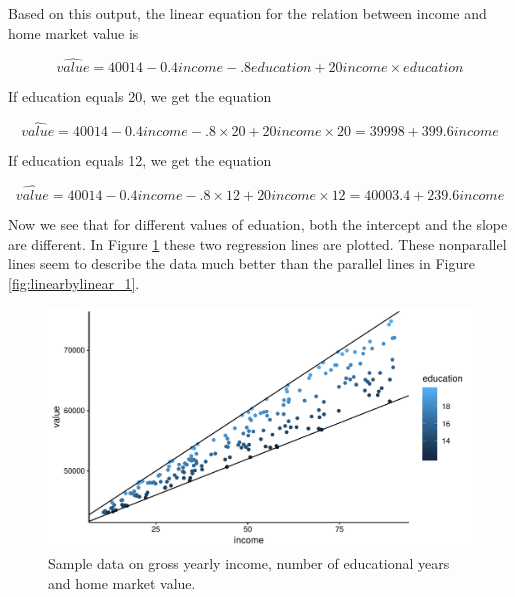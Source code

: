 \documentclass[]{book}\usepackage[]{graphicx}\usepackage[]{color}
\makeatletter
\def\maxwidth{ %
  \ifdim\Gin@nat@width>\linewidth
    \linewidth
  \else
    \Gin@nat@width
  \fi
}
\makeatother
\begin{document}
Based on this output, the linear equation for the relation between income and home market value is 

\begin{equation}
\widehat{value}= 40014 -0.4 income -.8 education + 20 income \times education
\end{equation}

If education equals 20, we get the equation

\begin{equation}
\widehat{value}= 40014 -0.4 income -.8 \times 20 + 20 income \times 20 = 39998 + 399.6 income
\end{equation}

If education equals 12, we get the equation 

\begin{equation}
\widehat{value}= 40014 - 0.4 income -.8 \times 12 + 20 income \times 12 = 40003.4 + 239.6 income
\end{equation}

Now we see that for different values of eduation, both the intercept and the slope are different. In Figure \ref{fig:linearbylinear_2} these two regression lines are plotted. These nonparallel lines seem to describe the data much better than the parallel lines in Figure \ref{fig:linearbylinear_1}. 

\begin{figure}

{\centering \includegraphics[width=\maxwidth]{figure/linearbylinear_2-1} 

}

\caption[Sample data on gross yearly income, number of educational years and home market value]{Sample data on gross yearly income, number of educational years and home market value.}\label{fig:linearbylinear_2}
\end{figure}
\end{document}
